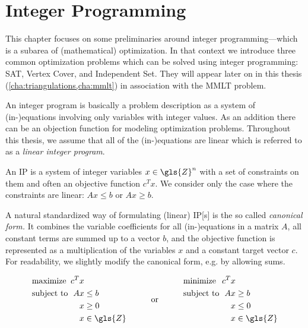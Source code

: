 \chapter{Integer Programming}
This chapter focuses on some preliminaries around integer
programming---which is a subarea of (mathematical) optimization.
In that context we introduce three common optimization problems which
can be solved using integer programming: SAT, Vertex Cover, and
Independent Set. They will appear later on in this thesis
(\cref{cha:triangulations,cha:mmlt}) in association with the
\gls{MMLT} problem.

An integer program is basically a problem description as a system
of (in-)equations involving only variables with integer values. As
an addition there can be an objection function for modeling
optimization problems. Throughout this thesis, we assume that all
of the (in-)equations are linear which is referred to as a
\emph{linear integer program}.

\begin{definition}
  An \gls{IP} is a system of integer variables
  \(x \in \gls{Z}^n\) with a set of constraints on them and often an 
  objective function \(c^T x\). We consider only the case where the 
  constraints are linear: \(Ax \leq b\) or \(Ax \geq b\).
\end{definition}

A natural standardized way of formulating (linear) \gls{IP}[s] is the 
so called \emph{canonical form.} It combines the variable coefficients
for all (in-)equations in a matrix \(A\), all constant terms are
summed up to a vector \(b\), and the objective function is represented
as a multiplication of the variables \(x\) and a constant target
vector \(c\). For readability, we slightly modify the canonical form,
e.g. by allowing sums.

\begin{problem}
  \[
  \begin{array}{lll}
    \begin{alignedat}{2}
      &\text{maximize } & c^Tx \\
      &\text{subject to } & Ax &\leq b \\
      && x &\geq 0 \\
      && x &\in \gls{Z}
    \end{alignedat}
    & \text{\hspace{2em}or\hspace{2em}} &
    \begin{alignedat}{2}
      &\text{minimize } & c^Tx \\
      &\text{subject to } & Ax &\geq b \\
      && x &\leq 0 \\
      && x &\in \gls{Z}
    \end{alignedat}
  \end{array}
  \]
\end{problem}

